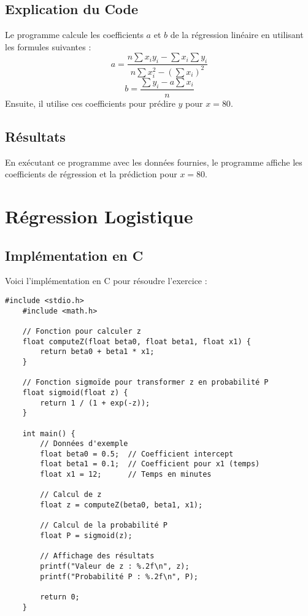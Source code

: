 \subsection*{Explication du Code}

Le programme calcule les coefficients \(a\) et \(b\) de la régression linéaire en utilisant les formules suivantes :
\[
a = \frac{n \sum x_i y_i - \sum x_i \sum y_i}{n \sum x_i^2 - (\sum x_i)^2}
\]
\[
b = \frac{\sum y_i - a \sum x_i}{n}
\]
Ensuite, il utilise ces coefficients pour prédire \(y\) pour \(x = 80\).

\subsection*{Résultats}

En exécutant ce programme avec les données fournies, le programme affiche les coefficients de régression et la prédiction pour \(x = 80\).



\section*{Régression Logistique}


\subsection*{Implémentation en C}

Voici l'implémentation en C pour résoudre l'exercice :

\begin{lstlisting}[caption=Implémentation de la Régression Logistique en C]
	#include <stdio.h>
	#include <math.h>
	
	// Fonction pour calculer z
	float computeZ(float beta0, float beta1, float x1) {
		return beta0 + beta1 * x1;
	}
	
	// Fonction sigmoïde pour transformer z en probabilité P
	float sigmoid(float z) {
		return 1 / (1 + exp(-z));
	}
	
	int main() {
		// Données d'exemple
		float beta0 = 0.5;  // Coefficient intercept
		float beta1 = 0.1;  // Coefficient pour x1 (temps)
		float x1 = 12;      // Temps en minutes
		
		// Calcul de z
		float z = computeZ(beta0, beta1, x1);
		
		// Calcul de la probabilité P
		float P = sigmoid(z);
		
		// Affichage des résultats
		printf("Valeur de z : %.2f\n", z);
		printf("Probabilité P : %.2f\n", P);
		
		return 0;
	}
\end{lstlisting}

